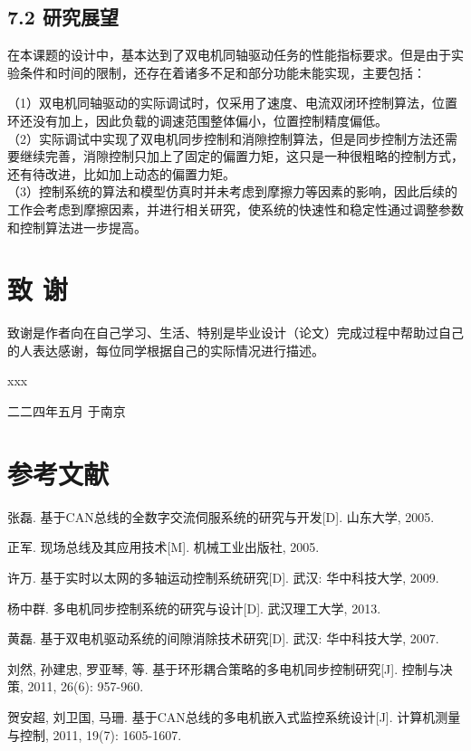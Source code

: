 \documentclass[UTF8,zihao=-4,openany,oneside]{ctexbook}
\begin{document}
\section{7.2 研究展望}

在本课题的设计中，基本达到了双电机同轴驱动任务的性能指标要求。但是由于实验条件和时间的限制，还存在着诸多不足和部分功能未能实现，主要包括：

\noindent （1）双电机同轴驱动的实际调试时，仅采用了速度、电流双闭环控制算法，位置环还没有加上，因此负载的调速范围整体偏小，位置控制精度偏低。\\

\noindent （2）实际调试中实现了双电机同步控制和消隙控制算法，但是同步控制方法还需要继续完善，消隙控制只加上了固定的偏置力矩，这只是一种很粗略的控制方式，还有待改进，比如加上动态的偏置力矩。\\

\noindent （3）控制系统的算法和模型仿真时并未考虑到摩擦力等因素的影响，因此后续的工作会考虑到摩擦因素，并进行相关研究，使系统的快速性和稳定性通过调整参数和控制算法进一步提高。\\

\chapter{致 谢}

致谢是作者向在自己学习、生活、特别是毕业设计（论文）完成过程中帮助过自己的人表达感谢，每位同学根据自己的实际情况进行描述。

xxx

二二四年五月 于南京

\chapter{参考文献}

张磊. 基于CAN总线的全数字交流伺服系统的研究与开发[D]. 山东大学, 2005.

正军. 现场总线及其应用技术[M]. 机械工业出版社, 2005.

许万. 基于实时以太网的多轴运动控制系统研究[D]. 武汉: 华中科技大学, 2009.

杨中群. 多电机同步控制系统的研究与设计[D]. 武汉理工大学, 2013.

黄磊. 基于双电机驱动系统的间隙消除技术研究[D]. 武汉: 华中科技大学, 2007.

刘然, 孙建忠, 罗亚琴, 等. 基于环形耦合策略的多电机同步控制研究[J]. 控制与决策, 2011, 26(6): 957-960.

贺安超, 刘卫国, 马珊. 基于CAN总线的多电机嵌入式监控系统设计[J]. 计算机测量与控制, 2011, 19(7): 1605-1607.
\end{document}
